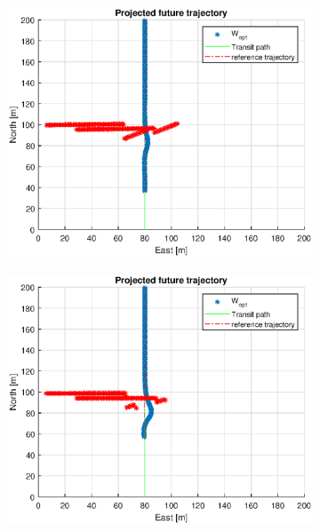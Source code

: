 \begin{figure}
\begin{subfigure}[b]{0.499\textwidth}
    \end{subfigure}
    \hfill
    \\
    \begin{subfigure}[b]{0.49\textwidth}
        \centering
        \includegraphics[width=\textwidth]{Images/Figures/sving_GW/Simple0_f999_Frame3}
    \end{subfigure}
    \hfill
    \begin{subfigure}[b]{0.499\textwidth}
        \centering
        \includegraphics[width=\textwidth]{Images/Figures/sving_GW/Simple0_f999_Frame4}

\end{subfigure}
\end{figure}
